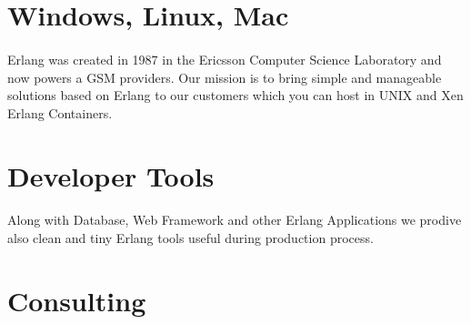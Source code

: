 \documentclass[11pt]{article}
\begin{document}
\paragraph{}
\paragraph{}

\section*{Windows, Linux, Mac}
\paragraph{}
Erlang was created in 1987 in the Ericsson Computer Science Laboratory
and now powers a GSM providers. Our mission is to bring simple and
manageable solutions based on Erlang to our customers which you can
host in UNIX and Xen Erlang Containers.

\section*{Developer Tools}
\paragraph{}
Along with Database, Web Framework and other Erlang Applications
we prodive also clean and tiny Erlang tools useful during
production process.

\section*{Consulting}
\end{document}
